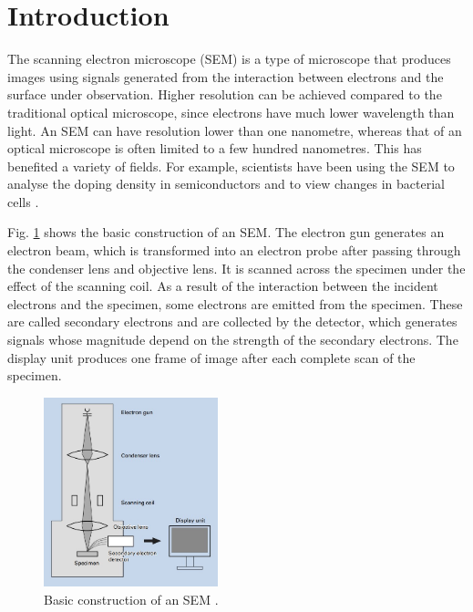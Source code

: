 \documentclass[12pt, conference]{IEEEtran}
\begin{document}
\begin{abstract}
\end{abstract}

\section{Introduction}
The scanning electron microscope (SEM) is a type of microscope that produces images using signals generated from the interaction between electrons and the surface under observation. Higher resolution can be achieved compared to the traditional optical microscope, since electrons have much lower wavelength than light. An SEM can have resolution lower than one nanometre, whereas that of an optical microscope is often limited to a few hundred nanometres. This has benefited a variety of fields. For example, scientists have been using the SEM to analyse the doping density in semiconductors \cite{SEM for semiconductors} and to view changes in bacterial cells \cite{SEM for bacterial cells}.

Fig. \ref{SEM basic construction} shows the basic construction of an SEM. The electron gun generates an electron beam, which is transformed into an electron probe after passing through the condenser lens and objective lens. It is scanned across the specimen under the effect of the scanning coil. As a result of the interaction between the incident electrons and the specimen, some electrons are emitted from the specimen. These are called secondary electrons and are collected by the detector, which generates signals whose magnitude depend on the strength of the secondary electrons. The display unit produces one frame of image after each complete scan of the specimen.

\begin{figure}[htbp]
    \centering
    \includegraphics[width=0.45\textwidth]{Images/SEM basic construction.jpg}
    \caption{Basic construction of an SEM \cite{SEM A to Z}.}
    \label{SEM basic construction}
\end{figure}
\end{document}
